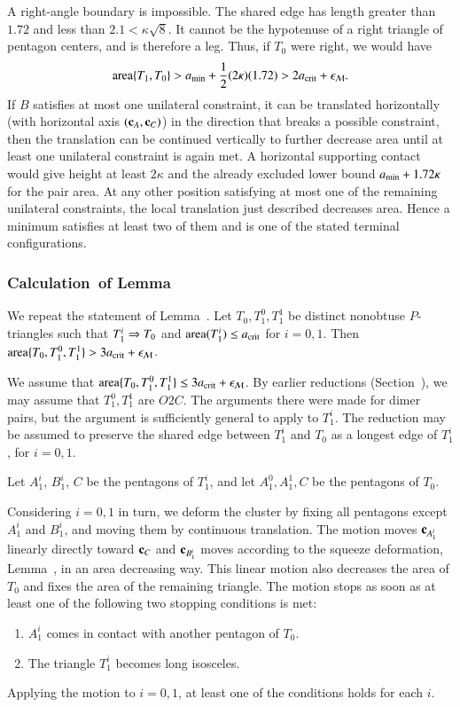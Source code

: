 A right-angle boundary is impossible. The shared edge has length
greater than $1.72$ and less than $2.1<\kappa\sqrt8$. It cannot be
the hypotenuse of a right triangle of pentagon centers, and is
therefore a leg. Thus, if $T_0$ were right, we would have
\[
{\operatorname{area}}\{T_1,T_0\} > a_\text{min} + \frac12(2\kappa)(1.72) > 2 a_\text{crit} + \epsilon_{\mathcal M}.
\]
If $B$ satisfies at most one unilateral constraint, it can be translated
horizontally (with horizontal axis $({\mathbf c}_A,{\mathbf c}_C)$) in the direction that breaks a
possible constraint,
then the translation can be continued vertically to further decrease area until
at least one unilateral constraint is again met.
A horizontal supporting contact would give height at least
$2\kappa$ and the already excluded lower bound $a_\text{min}+1.72\kappa$
for the pair area. At any other position satisfying at most one
of the remaining unilateral constraints, the local translation
just described decreases area. Hence a minimum satisfies at least
two of them and is one of the stated terminal configurations.

\subsubsection{Calculation~of Lemma~} %

We repeat the statement of Lemma~. Let
$T_0,T_1^0,T_1^1$ be distinct nonobtuse $P$-triangles such that
$T_1^i\Rightarrow T_0$ and ${\operatorname{area}}(T_1^i)\le a_\text{crit}$ for $i=0,1$. Then ${\operatorname{area}}\{T_0,T_1^0,T_1^1\} > 3a_\text{crit} +
\epsilon_{\mathcal M}$. %

We assume that ${\operatorname{area}}\{T_0,T_1^0,T_1^1\}\le 3a_\text{crit} + \epsilon_{\mathcal M}$.
By earlier reductions (Section~), we may assume
that $T_1^0,T_1^1$ are $O2C$.  The arguments there were made for dimer pairs, but the argument
is sufficiently general to apply to $T_1^i$.
The reduction may be assumed to preserve the shared edge between $T_1^i$ and $T_0$
as a longest edge of $T_1^i$, for $i=0,1$.

Let $A_1^i$, $B_1^i$, $C$ be the pentagons of $T_1^i$,
and let $A_1^0,A_1^1,C$ be the pentagons of $T_0$.

Considering $i=0,1$ in turn, we deform the cluster by fixing all pentagons
except $A_1^i$ and $B_1^i$, and moving them by continuous translation.
The motion moves ${\mathbf c}_{A_1^i}$ linearly directly toward ${\mathbf c}_C$ and ${\mathbf c}_{B_1^i}$
moves according to the squeeze deformation, Lemma~,
in an area decreasing way.  This linear motion also decreases the area
of $T_0$ and fixes the area of the remaining triangle.
The motion stops as soon as at least one of the
following two stopping conditions is met:
\begin{enumerate}
\item $A_1^i$ comes in contact with another pentagon of $T_0$.
\item The triangle $T_1^i$ becomes long isosceles.
\end{enumerate}
Applying the motion to $i=0,1$, at least one of the conditions holds for each $i$.

